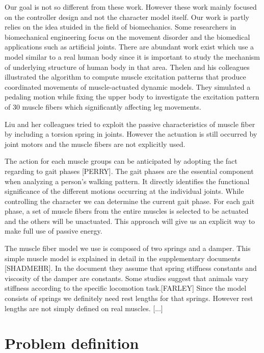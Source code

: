\documentclass[a4paper,10pt]{article}
\begin{document}
Our goal is not so different from these work. However these work mainly focused
on the controller design and not the character model itself. Our work is
partly relies on the idea stuided in the field of biomechanics.
Some researchers in biomechanical engineering focus on the movement
disorder and the biomedical applications such as artificial joints.
There are abundant work exist which use a model similar to
a real human body since it is important to study the mechanism of underlying
structure of human body in that area. Thelen and his colleagues illustrated
the algorithm to compute muscle excitation patterns that produce
coordinated movements of muscle-actuated dynamic models. They simulated
a pedaling motion while fixing the upper body to investigate the excitation
pattern of 30 muscle fibers which significantly affecting leg movements.

Liu and her colleagues tried to exploit the passive characteristics of
muscle fiber by including a torsion spring in joints. However the actuation
is still occurred by joint motors and the muscle fibers are not explicitly used.

The action for each muscle groups can be anticipated by adopting the
fact regarding to gait phases [PERRY]. The gait phases are the essential component
when analyzing a person's walking pattern. It directly identifies the
functional significance of the different motions occurring at the
individual joints. While controlling the character we
can determine the current gait phase. For each gait phase,
a set of muscle fibers from the entire muscles is selected to be actuated
and the others will be unactuated. This approach will give us an explicit
way to make full use of passive energy.

The muscle fiber model we use is composed of two springs and a damper.
This simple muscle model is explained in detail in the supplementary
documents [SHADMEHR]. In the document they assume that spring stiffness constants
and viscosity of the damper are constants. Some studies suggest that animals
vary stiffness according to the specific locomotion task.[FARLEY]
Since the model consists of springs we definitely need rest lengths for that
springs. However rest lengths are not simply defined on real muscles.
[...]

\pagebreak

\section{Problem definition}
\end{document}
